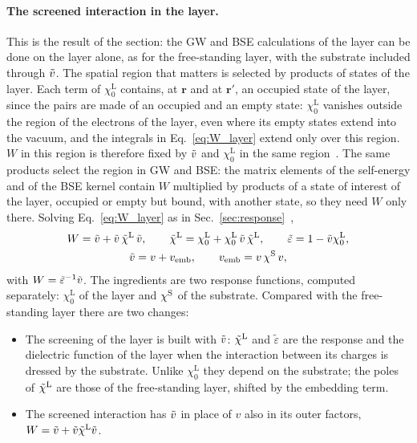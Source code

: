 \documentclass[10pt,a4paper]{paper}
\begin{document}
\paragraph{The screened interaction in the layer.} This is the result of the section: the GW and BSE calculations of
the layer can be done on the layer alone, as for the free-standing layer, with the substrate included through $\tilde{v}$.
The spatial region that matters is selected by products of states of the layer. Each term of $\chi_0^{\mathrm{L}}$
contains, at $\bm{r}$ and at $\bm{r}'$, an occupied state of the layer, since the pairs are made of an occupied and an
empty state: $\chi_0^{\mathrm{L}}$ vanishes outside the region of the electrons of the layer, even where its empty
states extend into the vacuum, and the integrals in Eq.~\eqref{eq:W_layer} extend only over this region. $W$ in this
region is therefore fixed by $\tilde{v}$ and $\chi_0^{\mathrm{L}}$ in the same region~\cite[Eq.~(11)]{amblard2024static}. The same
products select the region in GW and BSE: the matrix elements of the self-energy and of the BSE kernel contain $W$
multiplied by products of a state of interest of the layer, occupied or empty but bound, with another state, so they
need $W$ only there. Solving Eq.~\eqref{eq:W_layer} as in Sec.~\ref{sec:response}~\cite[Eqs.~(15)--(16)]{amblard2024static},
\begin{gather}
W = \tilde{v} + \tilde{v}\,\tilde{\chi}^{\mathrm{L}}\,\tilde{v} , \qquad \tilde{\chi}^{\mathrm{L}} = \chi_0^{\mathrm{L}} + \chi_0^{\mathrm{L}}\,\tilde{v}\,\tilde{\chi}^{\mathrm{L}} , \qquad
\tilde{\varepsilon} = 1 - \tilde{v}\chi_0^{\mathrm{L}} ,
\nonumber \\
\tilde{v} = v + v_{\mathrm{emb}} , \qquad v_{\mathrm{emb}} = v\,\chi^{\mathrm{S}}\,v ,
\label{eq:W_LL}
\end{gather}
with $W = \tilde{\varepsilon}^{-1}\tilde{v}$. The ingredients are two response functions, computed separately:
$\chi_0^{\mathrm{L}}$ of the layer and $\chi^{\mathrm{S}}$ of the substrate.
Compared with the free-standing layer there are two changes:
\begin{itemize}
\item The screening of the layer is built with $\tilde{v}$: $\tilde{\chi}^{\mathrm{L}}$ and $\tilde{\varepsilon}$ are the response and the
  dielectric function of the layer when the interaction between its charges is dressed by the substrate. Unlike
  $\chi_0^{\mathrm{L}}$ they depend on the substrate; the poles of $\tilde{\chi}^{\mathrm{L}}$ are those of the free-standing layer,
  shifted by the embedding term.
\item The screened interaction has $\tilde{v}$ in place of $v$ also in its outer factors, $W = \tilde{v} + \tilde{v}\tilde{\chi}^{\mathrm{L}}\tilde{v}$.
\end{itemize}
\end{document}
